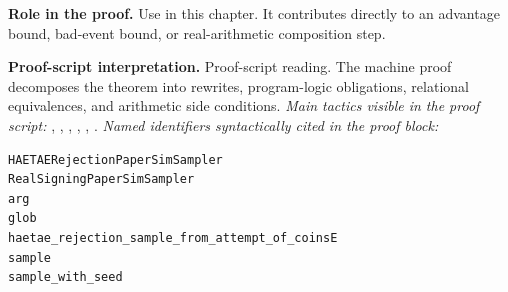 \begin{formaltheorem}
\noindent\textbf{Role in the proof.}
Use in this chapter. It contributes directly to an advantage bound, bad-event bound, or real-arithmetic composition step.

\noindent\textbf{Proof-script interpretation.}
Proof-script reading. The machine proof decomposes the theorem into rewrites, program-logic obligations, relational equivalences, and arithmetic side conditions.
\emph{Main tactics visible in the proof script:} , , , , , .
\emph{Named identifiers syntactically cited in the proof block:}
\begin{lstlisting}[language=EasyCrypt,basicstyle=\ttfamily\scriptsize]
HAETAERejectionPaperSimSampler
RealSigningPaperSimSampler
arg
glob
haetae_rejection_sample_from_attempt_of_coinsE
sample
sample_with_seed
\end{lstlisting}

\end{formaltheorem}

